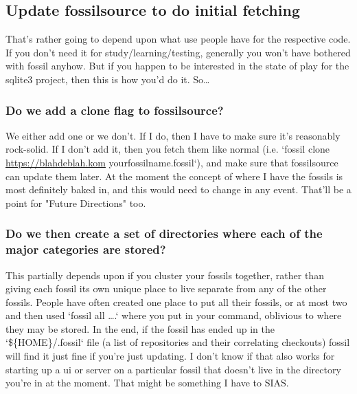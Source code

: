 \documentclass[11pt]{article}
\begin{document}
\subsection*{Update fossilsource to do initial fetching}
\label{sec:org572c4f6}

That's rather going to depend upon what use people have for the respective code. If you don't need
it for study/learning/testing, generally you won't have bothered with fossil anyhow. But if you
happen to be interested in the state of play for the sqlite3 project, then this is how you'd do
it. So…

\subsubsection*{Do we add a clone flag to fossilsource?}
\label{sec:orgbb158d3}

We either add one or we don't. If I do, then I have to make sure it's reasonably rock-solid. If I
don't add it, then you fetch them like normal (i.e. `fossil clone \url{https://blahdeblah.kom}
yourfossilname.fossil`), and make sure that fossilsource can update them later. At the moment the
concept of where I have the fossils is most definitely baked in, and this would need to change in
any event. That'll be a point for "Future Directions" too.

\subsubsection*{Do we then create a set of directories where each of the major categories are stored?}
\label{sec:org1d19aa8}

This partially depends upon if you cluster your fossils together, rather than giving each fossil its
own unique place to live separate from any of the other fossils. People have often created one place
to put all their fossils, or at most two and then used `fossil all \ldots{}.` where you put in your
command, oblivious to where they may be stored. In the end, if the fossil has ended up in the
`\$\{HOME\}/.fossil` file (a list of repositories and their correlating checkouts) fossil will find it
just fine if you're just updating. I don't know if that also works for starting up a ui or server on
a particular fossil that doesn't live in the directory you're in at the moment. That might be
something I have to SIAS.
\end{document}
